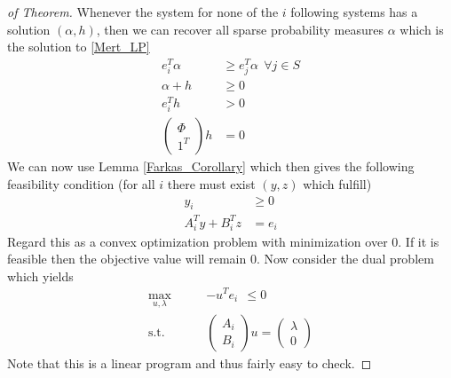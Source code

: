 \documentclass{article} %
\begin{document}
\begin{proof}[of Theorem]
Whenever the system for none of the $i$ following systems has a solution $(\alpha,h)$, then we can recover all sparse probability measures $\alpha$ which is the solution to \eqref{Mert_LP} 
\begin{align*}
e_i^T\alpha &\geq e_j^T \alpha \:\: \forall j \in S\\
\alpha + h &\geq 0\\
e_i^T h &> 0\\
\begin{pmatrix}\Phi\\ 1^T\end{pmatrix} h &= 0
\end{align*}
We can now use Lemma \ref{Farkas_Corollary} which then gives the following feasibility condition (for all $i$ there must exist  $(y,z)$ which fulfill)
\begin{align*}
\label{Maxrecovery_condition_Feasibility}
y_i &\geq 0\\
A_i^Ty + B_i^T z &= e_i
\end{align*}
Regard this as a convex optimization problem with minimization over $0$. If it is feasible then the objective value will remain 0. Now consider the dual problem which yields
\begin{align*}
\label{Maxrecovery_condition_Dual}
\max_{u,\lambda} \qquad &- u^T e_i\:\: \leq 0\\
\text{s.t.} \qquad& \begin{pmatrix} A_i\\ B_i \end{pmatrix} u = \begin{pmatrix} \lambda \\ 0\end{pmatrix}
\end{align*}
Note that this is a linear program and thus fairly easy to check. 
\end{proof}
\end{document}
